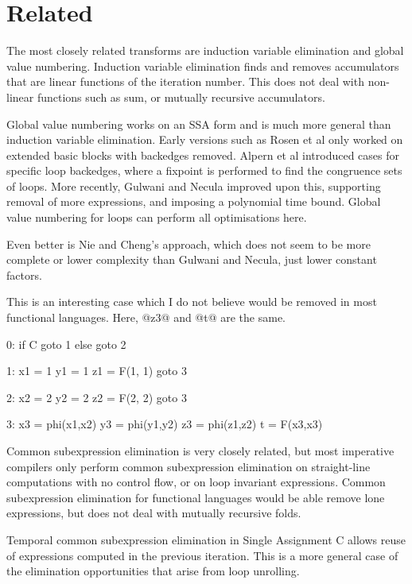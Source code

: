 \section{Related}
\label{s:Related}

The most closely related transforms are induction variable elimination\cite{shivers1988control} and global value numbering\cite{rosen1988global}.
Induction variable elimination finds and removes accumulators that are linear functions of the iteration number.
This does not deal with non-linear functions such as sum, or mutually recursive accumulators.

Global value numbering works on an SSA form and is much more general than induction variable elimination.
Early versions such as Rosen et al\cite{rosen1988global} only worked on extended basic blocks with backedges removed.
Alpern et al\cite{alpern1988detecting} introduced cases for specific loop backedges, where a fixpoint is performed to find the congruence sets of loops.
More recently, Gulwani and Necula\cite{gulwani2004polynomial} improved upon this, supporting removal of more expressions, and imposing a polynomial time bound.
Global value numbering for loops can perform all optimisations here.

Even better is Nie and Cheng's approach\cite{nie2007efficient}, which does not seem to be more complete or lower complexity than Gulwani and Necula, just lower constant factors.

This is an interesting case which I do not believe would be removed in most functional languages.
Here, @z3@ and @t@ are the same.
\begin{code}
0:
 if C goto 1
 else goto 2

1:
 x1 = 1
 y1 = 1
 z1 = F(1, 1)
goto 3

2:
 x2 = 2
 y2 = 2
 z2 = F(2, 2)
goto 3

3:
 x3 = phi(x1,x2)
 y3 = phi(y1,y2)
 z3 = phi(z1,z2)
 t  = F(x3,x3)
\end{code}


Common subexpression elimination is very closely related, but most imperative compilers only perform common subexpression elimination on straight-line computations with no control flow\cite{debray1992compiler}, or on loop invariant expressions\cite{bodik1998complete}.
Common subexpression elimination for functional languages would be able remove lone expressions, but does not deal with mutually recursive folds.

Temporal common subexpression elimination in Single Assignment C
allows reuse of expressions computed in the previous iteration\cite{imlig2001loop}.
This is a more general case of the elimination opportunities that arise from loop unrolling.

